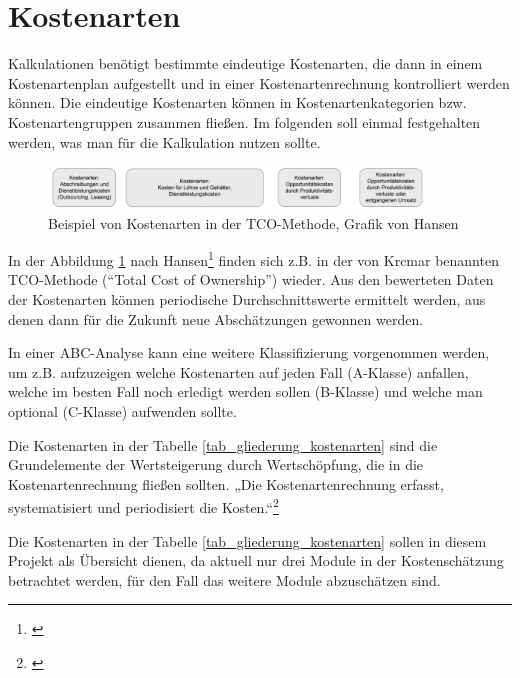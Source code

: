 \section{Kostenarten}
\label{section_kostenarten}
Kalkulationen benötigt bestimmte eindeutige Kostenarten, die dann in einem Kostenartenplan aufgestellt und in einer Kostenartenrechnung kontrolliert werden können. Die eindeutige Kostenarten können in Kostenartenkategorien bzw. Kostenartengruppen zusammen fließen.  Im folgenden soll einmal festgehalten werden, was man für die Kalkulation nutzen sollte.

\begin{figure}[h!]
	\centering
	\includegraphics[width=10cm]{kapitel/gruppe4_2/bilder/beispiel_kostenarten_TCO}
	\caption{Beispiel von Kostenarten in der TCO-Methode, Grafik von Hansen}
	\label{fig_kostenarten_TCO}
\end{figure}

In der Abbildung \ref{fig_kostenarten_TCO} nach Hansen\footnote{\cite{hansen_business_2009}} finden sich z.B. in der von Krcmar benannten TCO-Methode (“Total Cost of Ownership”) wieder. Aus den bewerteten Daten der Kostenarten können periodische Durchschnittswerte ermittelt werden, aus denen dann für die Zukunft neue Abschätzungen gewonnen werden.

In einer ABC-Analyse kann eine weitere Klassifizierung vorgenommen werden, um z.B. aufzuzeigen welche Kostenarten auf jeden Fall (A-Klasse) anfallen, welche im besten Fall noch erledigt werden sollen (B-Klasse) und welche man optional (C-Klasse) aufwenden sollte.

Die Kostenarten in der Tabelle \ref{tab_gliederung_kostenarten} sind die Grundelemente der Wertsteigerung durch Wertschöpfung, die in die Kostenartenrechnung fließen sollten. „Die Kostenartenrechnung erfasst, systematisiert und periodisiert die Kosten.“\footnote{\cite{reim_erfolgsrechnung_2015}} 

Die Kostenarten in der Tabelle \ref{tab_gliederung_kostenarten} sollen in diesem Projekt als Übersicht dienen, da aktuell nur drei Module in der Kostenschätzung betrachtet werden, für den Fall das weitere Module abzuschätzen sind.

